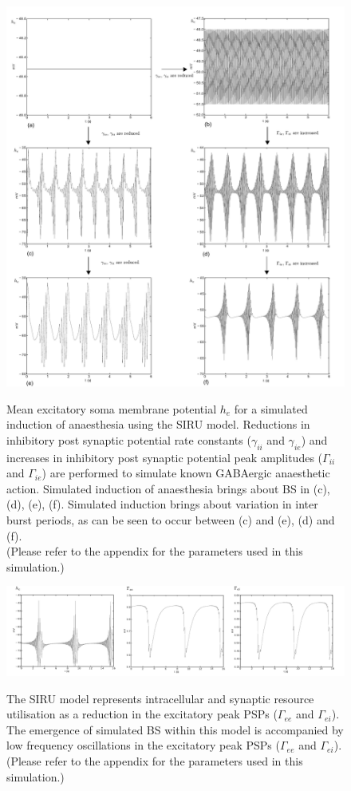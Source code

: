 \documentclass[a4paper,12pt]{article}
\begin{document}
\begin{figure}
	\includegraphics[scale=0.75]{frontiers-2012-working-images/figure-2-intra.pdf}
	\label{fig:intra_gamma}
	\caption{Mean excitatory soma membrane potential $h_e$ for a simulated induction of anaesthesia using the SIRU model. 
Reductions in inhibitory post synaptic potential rate constants ($\gamma_{ii}$ and $\gamma_{ie}$) and increases in inhibitory post synaptic potential peak amplitudes ($\Gamma_{ii}$ and $\Gamma_{ie}$) are performed to simulate known GABAergic anaesthetic action. Simulated induction of anaesthesia brings about BS in (c), (d), (e), (f). Simulated induction brings about variation in inter burst periods, as can be seen to occur between (c) and (e), (d) and (f).\\
(Please refer to the appendix for the parameters used in this simulation.)\\
}
\end{figure}

\begin{figure}
	\includegraphics[scale=0.75]{frontiers-2012-working-images/figure-3-intra.pdf}
      \label{fig:emerging_slow_intra}
	\caption{The SIRU model represents intracellular and synaptic resource utilisation as a reduction in the excitatory peak PSPs ($\Gamma_{ee}$ and $\Gamma_{ei}$). The emergence of simulated BS within this model is accompanied by low frequency oscillations in the excitatory peak PSPs ($\Gamma_{ee}$ and $\Gamma_{ei}$). 
	(Please refer to the appendix for the parameters used in this simulation.)}
\end{figure}
\end{document}
